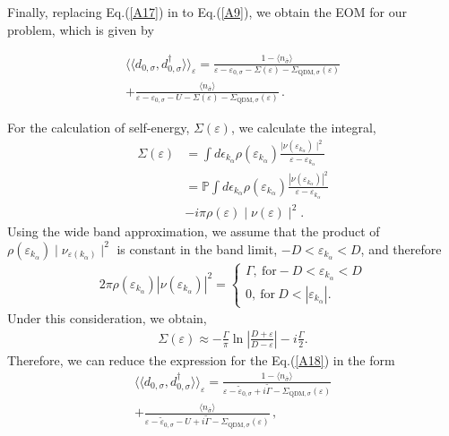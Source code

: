 \documentclass[aps,twocolumn,prb,superscript,floatfix,superscriptaddress,showpacs]{revtex4-1}
\newcommand{\ve}{\varepsilon}
\newcommand{\la}{\langle}
\newcommand{\ra}{\rangle}
\begin{document}
Finally, replacing 	Eq.(\ref{A17}) in to Eq.(\ref{A9}), we obtain the EOM for our problem, which is given by

\begin{eqnarray}
\la\la d_{0,\sigma},d_{0,\sigma}^{\dag} \ra\ra_{\ve} = \frac{1-\la n_{\bar{\sigma}}\ra}{\ve-\ve_{0,\sigma}-\Sigma(\ve) -\Sigma_{\text{QDM},\sigma}(\ve)} \nonumber \\ \label{A18}
+\frac{\la n_{\bar{\sigma}}\ra}{\ve-\ve_{0,\sigma}-U-\Sigma(\ve)-\Sigma_{\text{QDM},\sigma}(\ve)}\,.
\end{eqnarray}

For the calculation of self-energy, $\Sigma(\ve)$, we calculate the integral,
\begin{equation}
\begin{aligned}
\Sigma(\ve)&=\int d\epsilon_{k_{\alpha}} \rho\left(\ve_{k_{\alpha}}\right)\frac{\mid \nu(\ve_{k_{\alpha}}) \mid ^{2}}{\ve-\ve_{k_{\alpha}}} \\
&=\mathbb{P} \int d\epsilon_{k_{\alpha}} \rho\left(\ve_{k_{\alpha}}\right)\frac{|\nu(\ve_{k_{\alpha}})|^{2}}{\ve-\ve_{k_{\alpha}}} \\
& -i\pi \rho(\ve)\mid \nu(\ve)\mid^{2}.
\end{aligned}
\end{equation}
Using the wide band approximation, we assume that the product of $\rho(\ve_{k_{\alpha}})\mid\nu_{\ve({k_{\alpha}})}\mid^{2}$ is constant in the band limit, $-D<\ve_{k_{\alpha}}<D$, and therefore
\begin{eqnarray}
    2\pi\rho(\ve_{k_{\alpha}})|\nu(\ve_{k_{\alpha}})|^{2}=\left\{
                \begin{array}{ll}
                  \Gamma, \ \mbox{for} -D<\ve_{k_{\alpha}}<D \\
                  0, \ \mbox{for} \ D<|\ve_{k_{\alpha}}|.
                \end{array}
              \right.
 \end{eqnarray}
Under this consideration, we obtain,
\begin{equation}
\begin{aligned}
\Sigma(\varepsilon)\approx - \frac{\Gamma}{\pi}\ln\left|\frac{D+\ve}{D-\ve}\right|-i\frac{\Gamma}{2}.
\end{aligned}
\end{equation}
Therefore, we can reduce the expression for the Eq.(\ref{A18}) in the form
\begin{eqnarray}
\la\la d_{0,\sigma},d_{0,\sigma}^{\dag} \ra\ra_{\ve} = \frac{1-\la n_{\bar{\sigma}}\ra}{\ve-\tilde{\ve}_{0,\sigma}+i\tilde{\Gamma}-\Sigma_{\text{QDM},\sigma}(\ve)} \nonumber \\ \label{A22}
+\frac{\la n_{\bar{\sigma}}\ra}{\ve-\tilde{\ve}_{0,\sigma}-U+i\tilde{\Gamma}-\Sigma_{\text{QDM},\sigma}(\ve)}\,,
\end{eqnarray}
\end{document}
